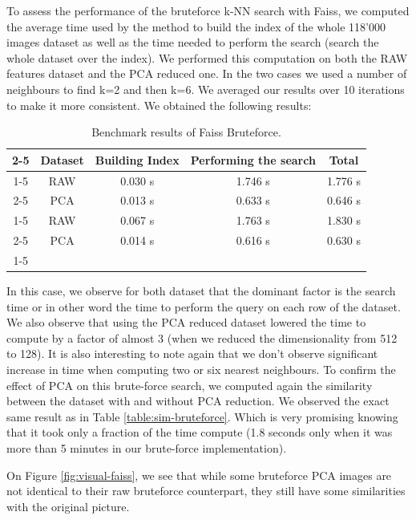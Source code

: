 \documentclass[a4paper]{article}
\begin{document}
To assess the performance of the bruteforce k-NN search with Faiss, we computed the average time used by the method to build the index of the whole 118'000 images dataset as well as the time needed to perform the search (search the whole dataset over the index). We performed this computation on both the RAW features dataset and the PCA reduced one. In the two cases we used a number of neighbours to find k=2 and then k=6. We averaged our results over 10 iterations to make it more consistent. We obtained the following results:

\begin{table}[h]
	\centering
	\begin{tabular}{ c | c | c | c | c |}
		\cline{2-5}
		& Dataset & Building Index & Performing the search & Total \\ \cline{1-5}
		\multicolumn{1}{ |c|  }{\multirow{2}{*}{k=2} } & RAW & 0.030 s & 1.746 s & 1.776 s \\ \cline{2-5}
		\multicolumn{1}{ |c|  }{} & PCA & 0.013 s & 0.633 s & 0.646 s \\ \cline{1-5}
		\multicolumn{1}{ |c|  }{\multirow{2}{*}{k=6} } & RAW & 0.067 s & 1.763 s & 1.830 s\\ \cline{2-5}
		\multicolumn{1}{ |c|  }{} & PCA & 0.014 s & 0.616 s & 0.630 s \\ \cline{1-5}
	\end{tabular}
	\caption{Benchmark results of Faiss Bruteforce.}
	\label{table:benchmark-faiss-bruteforce}
\end{table}


In this case, we observe for both dataset that the dominant factor is the search time or in other word the time to perform the query on each row of the dataset. We also observe that using the PCA reduced dataset lowered the time to compute by a factor of almost 3 (when we reduced the dimensionality from 512 to 128). It is also interesting to note again that we don't observe significant increase in time when computing two or six nearest neighbours. To confirm the effect of PCA on this brute-force search, we computed again the similarity between the dataset with and without PCA reduction. We observed the exact same result as in Table \ref{table:sim-bruteforce}. Which is very promising knowing that it took only a fraction of the time compute (1.8 seconds only when it was more than 5 minutes in our brute-force implementation).


On Figure \ref{fig:visual-faiss}, we see that while some bruteforce PCA images are not identical to their raw bruteforce counterpart, they still have some similarities with the original picture. 
\end{document}
